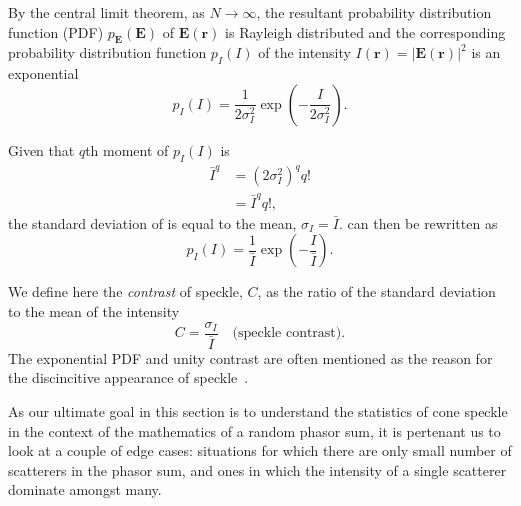 By the central limit theorem, as $N\to\infty$, the resultant probability
distribution function (PDF) $p_\mathbf{E}(\mathbf{E})$ of $\mathbf{E}(\mathbf{r})$ is Rayleigh distributed and the
corresponding probability distribution function $p_I(I)$ of the intensity
$I(\mathbf{r})=|\mathbf{E}(\mathbf{r})|^2$ is an exponential
\begin{equation}
p_I(I) = \frac{1}{2\sigma_I^2}\exp\left(-\frac{I}{2\sigma_I^2}\right).
\label{eqn:propexp}
\end{equation}

Given that $q$th moment of $p_I(I)$ is 
\begin{align}
\bar{I}^q&=(2\sigma_I^2)^q q!\\
         &=\bar{I}^q q!,
\end{align}
the standard deviation of is equal to the mean,
$\sigma_I=\bar{I}$.   can then be rewritten as
\begin{equation}
p_I(I) = \frac{1}{\bar{I}}\exp\left(-\frac{I}{\bar{I}}\right).
\label{eqn:exppdf}
\end{equation}

We define here the \textit{contrast} of speckle, $C$, as the
ratio of the standard deviation to the mean of the intensity
\begin{equation}
C=\frac{\sigma_I}{\bar{I}}\quad\text{(speckle contrast)}.
\label{eqn:specklecontrast}
\end{equation}
The exponential PDF and unity contrast are often mentioned as the reason
for the discincitive appearance of speckle~\cite{goodman2007speckle}.

As our ultimate goal in this section is to understand the statistics of cone
speckle in the context of the mathematics of a random phasor sum, it
is pertenant us to look at a couple of edge cases: situations for which
there are only small number of scatterers in the phasor sum, and ones in
which the intensity of a single scatterer dominate amongst many.

